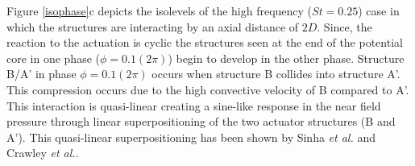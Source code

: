 \documentclass[english]{aiaa-tc}
\begin{document}
Figure \ref{isophase}c depicts the isolevels of the high frequency ($St=0.25$) case in which the structures are interacting by an axial distance of $2D$.
Since, the reaction to the actuation is cyclic the structures seen at the end of the potential core in one phase ($\phi=0.1(2\pi)$) begin to develop in the other phase. Structure B/A' in phase $\phi=0.1(2\pi)$ occurs when structure B collides into structure A'. This compression occurs due to the high convective velocity of B compared to A'. This interaction is quasi-linear creating a sine-like response in the near field pressure through linear superpositioning of the two actuator structures (B and A'). This quasi-linear superpositioning has been shown by Sinha {\em et al.}\cite{sinha2013} and Crawley {\em et al.}\cite{Crawley2014}.
\begin{figure}
\centering{}


\end{figure}
\end{document}
